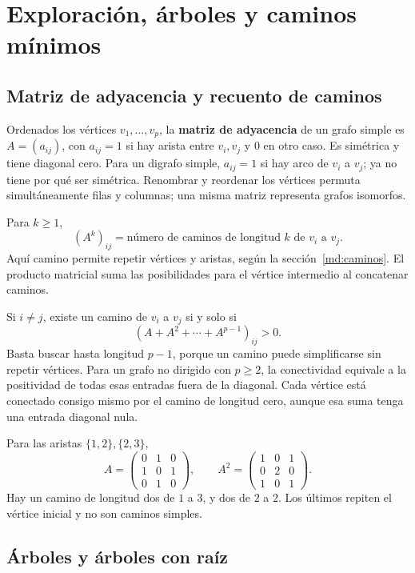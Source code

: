 \chapter{Exploración, árboles y caminos mínimos}
\label{md:exploracion}

\section{Matriz de adyacencia y recuento de caminos}
\label{md:adyacencia}

Ordenados los vértices $v_1,\ldots,v_p$, la \textbf{matriz de adyacencia}
de un grafo simple es $A=(a_{ij})$, con $a_{ij}=1$ si hay arista
entre $v_i,v_j$ y $0$ en otro caso. Es simétrica y tiene diagonal cero.
Para un digrafo simple, $a_{ij}=1$ si hay arco de $v_i$ a $v_j$;
ya no tiene por qué ser simétrica.
Renombrar y reordenar los vértices permuta simultáneamente filas
y columnas; una misma matriz representa grafos isomorfos.

Para $k\ge1$,
\[
 \boxed{(A^k)_{ij}=\text{número de caminos de longitud }k
          \text{ de }v_i\text{ a }v_j.}
\]
Aquí camino permite repetir vértices y aristas, según la
sección~\ref{md:caminos}. El producto matricial suma las posibilidades
para el vértice intermedio al concatenar caminos.

Si $i\ne j$, existe un camino de $v_i$ a $v_j$ si y solo si
\[
 (A+A^2+\cdots+A^{p-1})_{ij}>0.
\]
Basta buscar hasta longitud $p-1$, porque un camino puede simplificarse
sin repetir vértices. Para un grafo no dirigido con $p\ge2$, la
conectividad equivale a la positividad de todas esas entradas
fuera de la diagonal. Cada vértice está conectado consigo mismo
por el camino de longitud cero, aunque esa suma tenga una entrada
diagonal nula.

\begin{ejemplo}
Para las aristas $\{1,2\},\{2,3\}$,
\[
 A=\begin{pmatrix}0&1&0\\1&0&1\\0&1&0\end{pmatrix},\qquad
 A^2=\begin{pmatrix}1&0&1\\0&2&0\\1&0&1\end{pmatrix}.
\]
Hay un camino de longitud dos de $1$ a $3$, y dos de $2$ a $2$.
Los últimos repiten el vértice inicial y no son caminos simples.
\end{ejemplo}

\section{Árboles y árboles con raíz}
\label{md:arboles}


